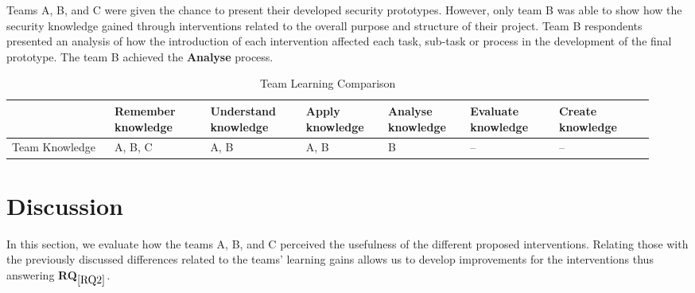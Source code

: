 \documentclass[runningheads]{llncs}
\newcommand{\hr}[1]{\textbf{RQ}$_{\ref{#1}}$}
\begin{document}
Teams A, B, and C were given the chance to present their developed security prototypes. However, only team B was able to show how the security knowledge gained through interventions related to the overall purpose and structure of their project. Team B respondents presented an analysis of how the introduction of each intervention affected each task, sub-task or process in the development of the final prototype. The team B achieved the \textbf{Analyse} process. 

\begin{table}[h]
\vspace{-5pt}
    \caption{Team Learning Comparison}
    \label{tab:bloomteamcomp}
    \centering
    \begin{tabular}{|p{0.15\linewidth}|p{0.14\linewidth}|p{0.14\linewidth}|p{0.12\linewidth}|p{0.12\linewidth}|p{0.13\linewidth}|p{0.14\linewidth}|}
    \hline
	 & Remember knowledge & Understand knowledge & Apply knowledge & Analyse knowledge & Evaluate knowledge & Create knowledge\\ \hline
	Team \newline Knowledge & A, B, C & A, B & A, B & B & -- & -- \\ \hline
    \end{tabular}
\end{table}


\section{Discussion}
In this section, we evaluate how the teams A, B, and C perceived the usefulness of the different proposed interventions. Relating those with the previously discussed differences related to the teams' learning gains allows us to develop improvements for the interventions thus answering \hr{RQ2}.
\end{document}

